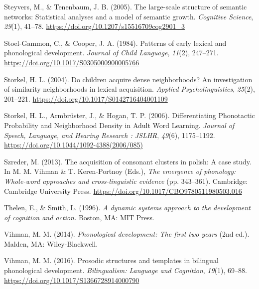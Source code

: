 \documentclass[
  man]{apa6}
\newlength{\cslhangindent}
\newlength{\cslentryspacingunit} %
\newenvironment{CSLReferences}[2] %
 {%
  \setlength{\parindent}{0pt}
  \ifodd #1
  \let\oldpar\par
  \def\par{\hangindent=\cslhangindent\oldpar}
  \fi
  \setlength{\parskip}{#2\cslentryspacingunit}
 }%
 {}
\begin{document}
\begin{CSLReferences}{1}{0}
\leavevmode{}%
Steyvers, M., \& Tenenbaum, J. B. (2005). The large-scale structure of semantic networks: Statistical analyses and a model of semantic growth. \emph{Cognitive Science}, \emph{29}(1), 41--78. \url{https://doi.org/10.1207/s15516709cog2901_3}

\leavevmode{}%
Stoel-Gammon, C., \& Cooper, J. A. (1984). Patterns of early lexical and phonological development. \emph{Journal of Child Language}, \emph{11}(2), 247--271. \url{https://doi.org/10.1017/S0305000900005766}

\leavevmode{}%
Storkel, H. L. (2004). Do children acquire dense neighborhoods? {An} investigation of similarity neighborhoods in lexical acquisition. \emph{Applied Psycholinguistics}, \emph{25}(2), 201--221. \url{https://doi.org/10.1017/S0142716404001109}

\leavevmode{}%
Storkel, H. L., Armbrüster, J., \& Hogan, T. P. (2006). Differentiating {Phonotactic} {Probability} and {Neighborhood} {Density} in {Adult} {Word} {Learning}. \emph{Journal of Speech, Language, and Hearing Research : JSLHR}, \emph{49}(6), 1175--1192. \url{https://doi.org/10.1044/1092-4388(2006/085)}

\leavevmode{}%
Szreder, M. (2013). The acquisition of consonant clusters in polish: A case study. In M. M. Vihman \& T. Keren-Portnoy (Eds.), \emph{The emergence of phonology: Whole-word approaches and cross-linguistic evidence} (pp. 343--361). Cambridge: Cambridge University Press. \url{https://doi.org/10.1017/CBO9780511980503.016}

\leavevmode{}%
Thelen, E., \& Smith, L. (1996). \emph{A dynamic systems approach to the development of cognition and action.} Boston, {MA}: {MIT} Press.

\leavevmode{}%
Vihman, M. M. (2014). \emph{Phonological development: The first two years} (2nd ed.). Malden, {MA}: Wiley-Blackwell.

\leavevmode{}%
Vihman, M. M. (2016). Prosodic structures and templates in bilingual phonological development. \emph{Bilingualism: Language and Cognition}, \emph{19}(1), 69--88. \url{https://doi.org/10.1017/S1366728914000790}


\end{CSLReferences}
\end{document}
